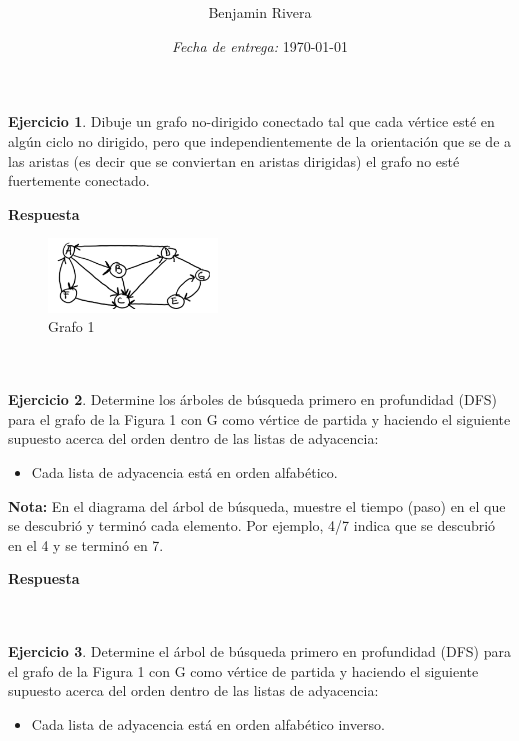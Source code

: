\documentclass[12pt]{article}
\title{\titulo\\ \materia}
\author{Benjamin Rivera}
\date{\textit{Fecha de entrega:} \today}
\begin{document}
\maketitle

\noindent
\textbf{Ejercicio 1}. Dibuje un grafo no-dirigido conectado tal que cada vértice esté en algún ciclo no dirigido, pero que independientemente de la orientación que se de a las aristas (es decir que se conviertan en aristas dirigidas) el grafo no esté fuertemente conectado.

\par \textbf{Respuesta}




\begin{figure}[h]
	\centering
	\includegraphics[width=0.4\textwidth]{grafo1.png}
	\caption{Grafo 1}
	\label{fig: 1}
\end{figure}






\par\ \\\ \\\noindent
\textbf{Ejercicio 2}. Determine los árboles de búsqueda primero en profundidad (DFS) para el
grafo de la Figura 1 con G como vértice de partida y haciendo el siguiente supuesto acerca
del orden dentro de las listas de adyacencia:
\begin{itemize}
	\item Cada lista de adyacencia está en orden alfabético.
\end{itemize}

\textbf{Nota:} En el diagrama del árbol de búsqueda, muestre el tiempo (paso) en el que se descubrió y terminó cada elemento. Por ejemplo, 4/7 indica que se descubrió en el 4 y se terminó en 7.

\par \textbf{Respuesta}





\par\ \\\ \\\noindent
\textbf{Ejercicio 3}. Determine el árbol de búsqueda primero en profundidad (DFS) para el grafo de la Figura 1 con G como vértice de partida y haciendo el siguiente supuesto acerca del orden dentro de las listas de adyacencia:
\begin{itemize}
	\item Cada lista de adyacencia está en orden alfabético inverso.
\end{itemize}
\end{document}
